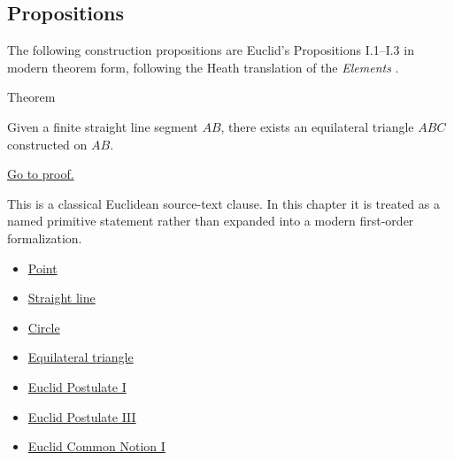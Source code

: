\subsection*{Propositions}

\begin{remark*}
The following construction propositions are Euclid's Propositions I.1--I.3 in
modern theorem form, following the Heath translation of the
\textit{Elements} \citep[Book I, Propositions 1--3]{euclid-elements-heath}.
\end{remark*}


\begin{theorembox}{Theorem}
\begin{theorem}
\label{thm:euclid-i-1}
Given a finite straight line segment $AB$, there exists an equilateral
triangle $ABC$ constructed on $AB$.
\end{theorem}
\end{theorembox}
\begin{remark*}[Proof]
\hyperref[prf:euclid-i-1]{Go to proof.}
\end{remark*}
\begin{remark*}
This is a classical Euclidean source-text clause. In this chapter it is treated
as a named primitive statement rather than expanded into a modern first-order
formalization.
\end{remark*}
\begin{lra-not-visible}
\begin{dependencies}
\begin{itemize}
  \item \hyperref[def:euclid-point]{Point}
  \item \hyperref[def:euclid-straight-line]{Straight line}
  \item \hyperref[def:euclid-circle]{Circle}
  \item \hyperref[def:euclid-triangle-side-classes]{Equilateral triangle}
  \item \hyperref[ax:euclid-postulate-draw-straight-line]{Euclid Postulate I}
  \item \hyperref[ax:euclid-postulate-describe-circle]{Euclid Postulate III}
  \item \hyperref[ax:euclid-common-notion-things-equal-to-same]{Euclid Common Notion I}
\end{itemize}
\end{dependencies}
\end{lra-not-visible}

